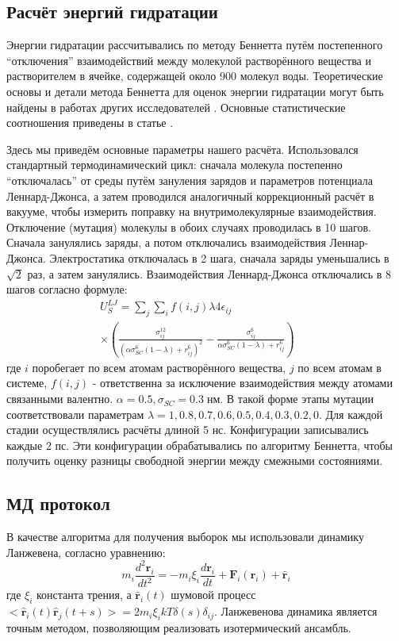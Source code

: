 \subsection{\label{sec:hfe_method} Расчёт энергий гидратации}
Энергии гидратации рассчитывались по методу Беннетта \cite{bar} путём постепенного ``отключения'' взаимодействий между молекулой растворённого вещества и растворителем в ячейке, содержащей около 900 молекул воды.
Теоретические основы и детали метода Беннетта для оценок энергии гидратации могут быть найдены в работах других исследователей \cite{smith_bar,bar_comp,shirts_waterff}. Основные статистические соотношения приведены в статье \cite{shaytan_free_2010}.

Здесь мы приведём основные параметры нашего расчёта. Использовался стандартный термодинамический цикл: сначала молекула постепенно ``отключалась'' от среды путём зануления зарядов и параметров потенциала Леннард-Джонса, а затем проводился аналогичный коррекционный расчёт в вакууме, чтобы измерить поправку на внутримолекулярные взаимодействия. Отключение (мутация) молекулы в обоих случаях проводилась в 10 шагов. Сначала занулялись заряды, а потом отключались взаимодействия Леннар-Джонса. Электростатика отключалась в 2 шага, сначала заряды уменьшались в $\sqrt{2}$ раз, а затем занулялись. Взаимодействия Леннард-Джонса отключались в 8 шагов согласно формуле:
\begin{eqnarray}
U^{LJ}_{S}=\sum_{j}\sum_{i}f(i,j)\lambda4\epsilon_{ij}& & \nonumber \\
  \times\left(\frac{\sigma_{ij}^{12}} {(\alpha\sigma_{SC}^6(1-\lambda)+r_{ij}^6)^2}-\frac{\sigma_{ij}^6}{\alpha\sigma_{SC}^6(1-\lambda)+r_{ij}^6}\right) & &
\end{eqnarray} где $i$ поробегает по всем атомам растворённого вещества, $j$ по всем атомам в системе, $f(i,j)$ - ответственна за исключение взаимодействия между атомами связанными валентно. $\alpha=0.5,\sigma_{SC}=0.3\;нм$. В такой форме этапы мутации соответствовали параметрам $\lambda=1,0.8,0.7,0.6,0.5,0.4,0.3,0.2,0$. Для каждой стадии осуществлялись расчёты длиной 5 нс. Конфигурации записывались каждые 2 пс. Эти конфигурации обрабатывались по алгоритму Беннетта, чтобы получить оценку разницы свободной энергии между смежными состояниями.

\subsection{\label{sec:simprot}МД протокол}
В качестве алгоритма для получения выборок мы использовали динамику Ланжевена, согласно уравнению: 
\begin{equation}
m_i\frac{d^2\mathbf{r}_i}{dt^2}=-m_i\xi_i\frac{d\mathbf{r}_i}{dt}+\mathbf{F}_i(\mathbf{r}_i)+\hat{\mathbf{r}}_i
\label{langevin}
\end{equation}
где $\xi_i$ константа трения, а $\hat{\mathbf{r}}_i(t)$ шумовой процесс $<\hat{\mathbf{r}}_i(t)\hat{\mathbf{r}}_j(t+s)>=2m_i\xi_ikT\delta(s)\delta_{ij}$. Ланжевенова динамика является точным методом, позволяющим реализовать изотермический ансамбль.

